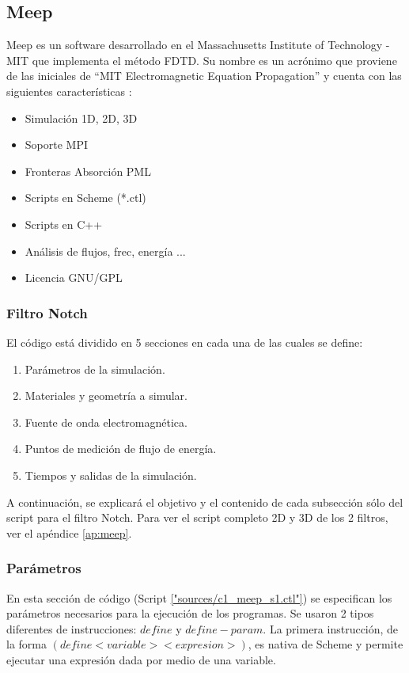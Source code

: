 \subsection{Meep}
\label{ss:c1_meep}

Meep es un software desarrollado en el Massachusetts Institute of Technology - MIT
que implementa el método FDTD. 
Su nombre es un acrónimo que proviene de las iniciales de 
“MIT Electromagnetic Equation Propagation” y cuenta con las siguientes características 
\cite{oskooi2010meep}:

\begin{itemize}
\item Simulación 1D, 2D, 3D
\item Soporte MPI
\item Fronteras Absorción  PML 
\item Scripts  en Scheme (*.ctl)
\item Scripts en C++
\item Análisis de flujos, frec, energía ...
\item Licencia GNU/GPL
\end{itemize} 

\subsubsection{Filtro Notch}

El código está dividido en 5 secciones en cada una de las cuales se define: 
\begin{enumerate}
\item Parámetros de la simulación.
\item Materiales y geometría a simular.
\item Fuente de onda electromagnética.
\item Puntos de medición de flujo de energía.
\item Tiempos y salidas de la simulación.
\end{enumerate} 

A continuación, se explicará el objetivo y el contenido de cada subsección 
sólo del script para el filtro Notch. Para ver el script completo 2D y 3D
de los 2 filtros, ver el apéndice \ref{ap:meep}.

\subsubsection{Parámetros}
En esta sección de código (Script \ref{"sources/c1_meep_s1.ctl"}) 
se especifican los parámetros necesarios para la ejecución de los programas. 
Se usaron 2 tipos diferentes de instrucciones: $define$ y $define-param$. 
La primera instrucción, de la forma $(define <variable> <expresion>)$, es nativa de Scheme y permite 
ejecutar una expresión dada por medio de una variable. 

